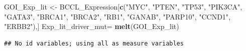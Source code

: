 \documentclass[]{article}
\newenvironment{Shaded}{\begin{snugshade}}{\end{snugshade}}
\newcommand{\KeywordTok}[1]{\textcolor[rgb]{0.13,0.29,0.53}{\textbf{#1}}}
\newcommand{\NormalTok}[1]{#1}
\newcommand{\StringTok}[1]{\textcolor[rgb]{0.31,0.60,0.02}{#1}}
\begin{document}
\begin{Shaded}
\begin{Highlighting}[]
\NormalTok{GOI_Exp_lit <-}\StringTok{ }\NormalTok{BCCL_Expression[}\KeywordTok{c}\NormalTok{(}\StringTok{"MYC"}\NormalTok{, }\StringTok{"PTEN"}\NormalTok{, }\StringTok{"TP53"}\NormalTok{, }\StringTok{"PIK3CA"}\NormalTok{, }\StringTok{"GATA3"}\NormalTok{, }\StringTok{"BRCA1"}\NormalTok{, }\StringTok{"BRCA2"}\NormalTok{, }\StringTok{"RB1"}\NormalTok{, }\StringTok{"GANAB"}\NormalTok{, }\StringTok{"PARP10"}\NormalTok{, }\StringTok{"CCND1"}\NormalTok{, }\StringTok{"ERBB2"}\NormalTok{),]}
\NormalTok{Exp_lit_driver_mut=}\StringTok{ }\KeywordTok{melt}\NormalTok{(GOI_Exp_lit)}
\end{Highlighting}
\end{Shaded}

\begin{verbatim}
## No id variables; using all as measure variables
\end{verbatim}
\end{document}
